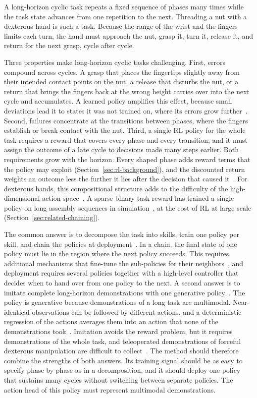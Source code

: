 A long-horizon cyclic task repeats a fixed sequence of phases many times while the task state advances from one repetition to the next. Threading a nut with a dexterous hand is such a task. Because the range of the wrist and the fingers limits each turn, the hand must approach the nut, grasp it, turn it, release it, and return for the next grasp, cycle after cycle.

Three properties make long-horizon cyclic tasks challenging. First, errors compound across cycles. A grasp that places the fingertips slightly away from their intended contact points on the nut, a release that disturbs the nut, or a return that brings the fingers back at the wrong height carries over into the next cycle and accumulates. A learned policy amplifies this effect, because small deviations lead it to states it was not trained on, where its errors grow further~\cite{Ross2011}. Second, failures concentrate at the transitions between phases, where the fingers establish or break contact with the nut. Third, a single \ac{RL} policy for the whole task requires a reward that covers every phase and every transition, and it must assign the outcome of a late cycle to decisions made many steps earlier. Both requirements grow with the horizon. Every shaped phase adds reward terms that the policy may exploit (Section~\ref{sec:rl-background}), and the discounted return weights an outcome less the further it lies after the decision that caused it~\cite{Sutton2018,Kober2013}. For dexterous hands, this compositional structure adds to the difficulty of the high-dimensional action space~\cite{Chen2023}. A sparse binary task reward has trained a single policy on long assembly sequences in simulation~\cite{Zhang2026}, at the cost of \ac{RL} at large scale (Section~\ref{sec:related-chaining}).

The common answer is to decompose the task into skills, train one policy per skill, and chain the policies at deployment~\cite{Chen2023}. In a chain, the final state of one policy must lie in the region where the next policy succeeds. This requires additional mechanisms that fine-tune the sub-policies for their neighbors~\cite{Chen2023,Lee2022}, and deployment requires several policies together with a high-level controller that decides when to hand over from one policy to the next. A second answer is to imitate complete long-horizon demonstrations with one generative policy~\cite{Chi2024,Black2026}. The policy is generative because demonstrations of a long task are multimodal. Near-identical observations can be followed by different actions, and a deterministic regression of the actions averages them into an action that none of the demonstrations took~\cite{Chi2024}. Imitation avoids the reward problem, but it requires demonstrations of the whole task, and teleoperated demonstrations of forceful dexterous manipulation are difficult to collect~\cite{Kedia2026}. The method should therefore combine the strengths of both answers. Its training signal should be as easy to specify phase by phase as in a decomposition, and it should deploy one policy that sustains many cycles without switching between separate policies. The action head of this policy must represent multimodal demonstrations.

